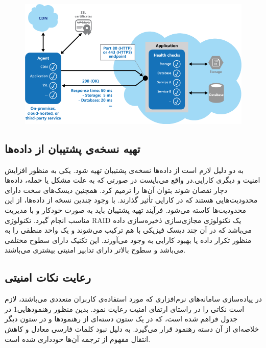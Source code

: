   
\begin{figure}[H]
\centering
\includegraphics[scale=.4]{img/monitoring.png}
\end{figure}

\subsection{تهیه نسخه‌ی پشتیبان از داده‌ها}
  
 به دو دلیل لازم است از داده‌ها نسخه‌ی پشتیبان تهیه شود. یکی به منظور افزایش امنیت و دیگری کارایی.در واقع می‌بایست در صورتی که به علت مشکل یا حمله، داده‌ها دچار نقصان شوند بتوان آن‌ها را ترمیم کرد. همچنین دیسک‌های سخت دارای محدودیت‌هایی هستند که در کارایی تأثیر گذارند. با وجود چندین نسخه از داده‌ها، از این محدودیت‌ها کاسته می‌شود. فرآیند تهیه پشتیبان باید به صورت خودکار و با مدیریت مناسب انجام گیرد.
 تکنولوژی RAID   یک تکنولوژی مجازی‌سازی ذخیره‌سازی داده می‌باشد که در آن چند دیسک فیزیکی با هم ترکیب می‌شوند و یک واحد منطقی را به منظور تکرار داده یا بهبود کارایی به وجود می‌آورند. این تکنیک دارای سطوح مختلفی می‌باشد و سطوح بالاتر دارای تدابیر امنیتی بیشتری می‌باشند. 
 
\subsection{رعایت نکات امنیتی} 
 در پیاده‌سازی سامانه‌های نرم‌افزاری که مورد استفاده‌ی کاربران متعددی می‌باشند، لازم است نکاتی را در راستای ارتقای امنیت رعایت نمود. بدین منظور رهنمودهایی1 در جدول    فراهم شده است، که در یک ستون دسته‌ای از رهنمودها و در ستون دیگر خلاصه‌ای از آن دسته رهنمود قرار می‌گیرد. به دلیل نبود کلمات فارسی معادل و کاهش انتقال مفهوم از ترجمه آن‌ها خودداری شده است. 
 
